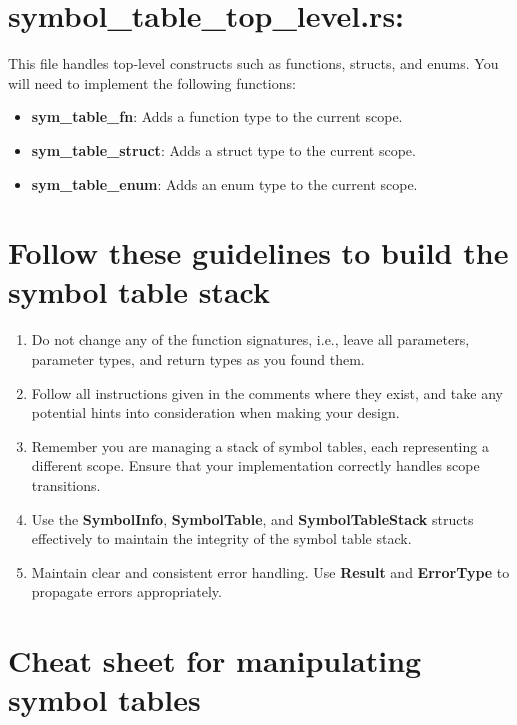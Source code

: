 \documentclass[
	12pt, %
]{fphw}
\begin{document}
\section*{symbol\_table\_top\_level.rs:}
This file handles top-level constructs such as functions, structs, and enums. You will need to implement the following functions:
\begin{itemize}
    \item \textbf{sym\_table\_fn}: Adds a function type to the current scope.
    \item \textbf{sym\_table\_struct}: Adds a struct type to the current scope.
    \item \textbf{sym\_table\_enum}: Adds an enum type to the current scope.
\end{itemize}

\pagebreak

\section*{Follow these guidelines to build the symbol table stack}

\begin{problem}
    \begin{enumerate}
        \item Do not change any of the function signatures, i.e., leave all parameters, parameter types, and return types as you found them.
        \item Follow all instructions given in the comments where they exist, and take any potential hints into consideration when making your design.
        \item Remember you are managing a stack of symbol tables, each representing a different scope. Ensure that your implementation correctly handles scope transitions.
        \item Use the \textbf{SymbolInfo}, \textbf{SymbolTable}, and \textbf{SymbolTableStack} structs effectively to maintain the integrity of the symbol table stack.
        \item Maintain clear and consistent error handling. Use \textbf{Result} and \textbf{ErrorType} to propagate errors appropriately.
    \end{enumerate}
\end{problem}

\section*{Cheat sheet for manipulating symbol tables}
\end{document}
